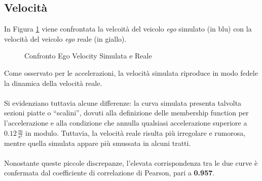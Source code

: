 \subsection{Velocità}
\noindent In Figura \ref{fig:ego_velocity_reale} viene confrontata la velcoità del veicolo \emph{ego} simulato (in blu) 
con la velocità del veicolo \emph{ego} reale (in giallo). 
\begin{figure}[H]
    \centering
    \caption{Confronto Ego Velocity Simulata e Reale}
    \label{fig:ego_velocity_reale}
\end{figure}
\noindent Come osservato per le accelerazioni, la velocità simulata riproduce in modo fedele la dinamica della velocità reale.  
\\\\
\noindent Si evidenziano tuttavia alcune differenze: la curva simulata presenta talvolta sezioni piatte o “scalini”, 
dovuti alla definizione delle membership function per l'accelerazione e alla condizione che annulla qualsiasi 
accelerazione superiore a $0.12 \,\frac{\mathrm{m}}{\mathrm{s^2}}$ in modulo.
Tuttavia, la velocità reale risulta più irregolare e rumorosa, mentre quella simulata appare più smussata in alcuni tratti.  
\\\\
\noindent Nonostante queste piccole discrepanze, l'elevata corrispondenza tra le due curve è confermata dal coefficiente di 
correlazione di Pearson, pari a \textbf{0.957}.
